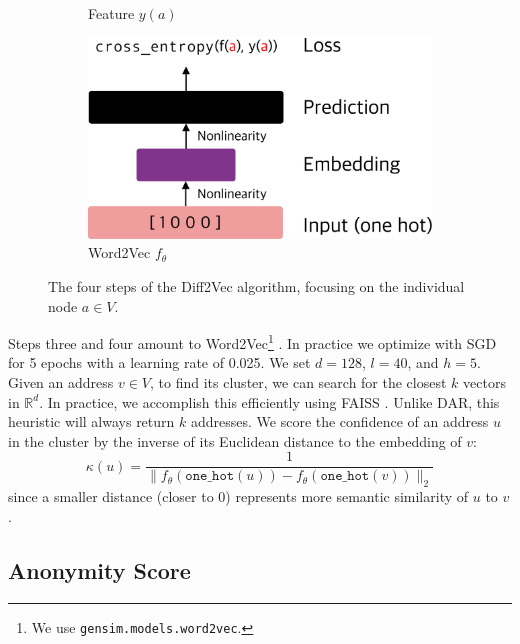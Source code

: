 \begin{figure}[h!]
\begin{subfigure}[b]{0.4\linewidth}
  \caption{Feature $y(a)$}
  \end{subfigure}
  \hfill
  \begin{subfigure}[b]{0.4\linewidth}
  \centering
  \includegraphics[width=\textwidth]{figures/diff2vec4}
  \caption{Word2Vec $f_\theta$}
  \end{subfigure}
  \hfill
\caption{The four steps of the Diff2Vec algorithm, focusing on the individual node $a \in V$.}
\label{fig:diff2vec}
\end{figure}

Steps three and four amount to Word2Vec\footnote{We use \texttt{gensim.models.word2vec}.} \citep{mikolov2013efficient,mikolov2013distributed}. In practice we optimize with SGD for 5 epochs with a learning rate of 0.025. We set $d = 128$, $l = 40$, and $h = 5$. Given an address $v \in V$, to find its cluster, we can search for the closest $k$ vectors in $\mathbb{R}^d$. In practice, we accomplish this efficiently using FAISS \citep{johnson2019billion}. Unlike DAR, this heuristic will always return $k$ addresses. We score the confidence of an address $u$ in the cluster by the inverse of its Euclidean distance to the embedding of $v$:
\begin{equation*}
\kappa(u) = \frac{1}{\|f_\theta(\texttt{one\_hot}(u)) - f_\theta(\texttt{one\_hot}(v))\|_2}
\end{equation*}
since a smaller distance (closer to 0) represents more semantic similarity of $u$ to $v$.

\subsection{Anonymity Score}
\label{sec:anonymityscore}

